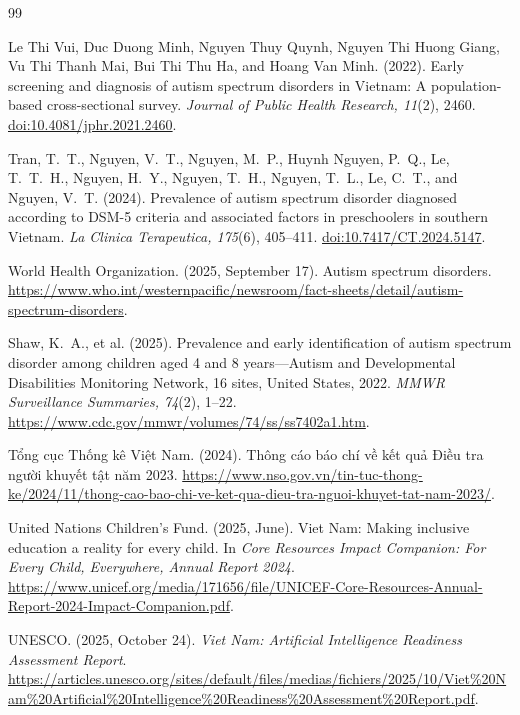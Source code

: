 \documentclass[11pt,a4paper]{article}
\begin{document}
\begin{thebibliography}{99}
\footnotesize
\setlength{\itemsep}{1pt}
\setlength{\parskip}{0pt}
\setlength{\parsep}{0pt}

Le Thi Vui, Duc Duong Minh, Nguyen Thuy Quynh, Nguyen Thi Huong Giang,
Vu Thi Thanh Mai, Bui Thi Thu Ha, and Hoang Van Minh. (2022).
\newblock Early screening and diagnosis of autism spectrum disorders in Vietnam:
A population-based cross-sectional survey.
\newblock \emph{Journal of Public Health Research, 11}(2), 2460.
\newblock \href{https://doi.org/10.4081/jphr.2021.2460}{doi:10.4081/jphr.2021.2460}.

Tran, T.~T., Nguyen, V.~T., Nguyen, M.~P., Huynh Nguyen, P.~Q., Le, T.~T.~H.,
Nguyen, H.~Y., Nguyen, T.~H., Nguyen, T.~L., Le, C.~T., and Nguyen, V.~T.
(2024).
\newblock Prevalence of autism spectrum disorder diagnosed according to DSM-5
criteria and associated factors in preschoolers in southern Vietnam.
\newblock \emph{La Clinica Terapeutica, 175}(6), 405--411.
\newblock \href{https://doi.org/10.7417/CT.2024.5147}{doi:10.7417/CT.2024.5147}.

World Health Organization. (2025, September 17).
\newblock Autism spectrum disorders.
\newblock \url{https://www.who.int/westernpacific/newsroom/fact-sheets/detail/autism-spectrum-disorders}.

Shaw, K.~A., et al. (2025).
\newblock Prevalence and early identification of autism spectrum disorder among
children aged 4 and 8 years---Autism and Developmental Disabilities Monitoring
Network, 16 sites, United States, 2022.
\newblock \emph{MMWR Surveillance Summaries, 74}(2), 1--22.
\newblock \url{https://www.cdc.gov/mmwr/volumes/74/ss/ss7402a1.htm}.

Tổng cục Thống kê Việt Nam. (2024).
\newblock Thông cáo báo chí về kết quả Điều tra người khuyết tật năm 2023.
\newblock \url{https://www.nso.gov.vn/tin-tuc-thong-ke/2024/11/thong-cao-bao-chi-ve-ket-qua-dieu-tra-nguoi-khuyet-tat-nam-2023/}.

United Nations Children's Fund. (2025, June).
\newblock Viet Nam: Making inclusive education a reality for every child.
\newblock In \emph{Core Resources Impact Companion: For Every Child, Everywhere,
Annual Report 2024}.
\newblock \url{https://www.unicef.org/media/171656/file/UNICEF-Core-Resources-Annual-Report-2024-Impact-Companion.pdf}.

UNESCO. (2025, October 24).
\newblock \emph{Viet Nam: Artificial Intelligence Readiness Assessment Report}.
\newblock \url{https://articles.unesco.org/sites/default/files/medias/fichiers/2025/10/Viet%20Nam%20Artificial%20Intelligence%20Readiness%20Assessment%20Report.pdf}.


\end{thebibliography}
\end{document}
